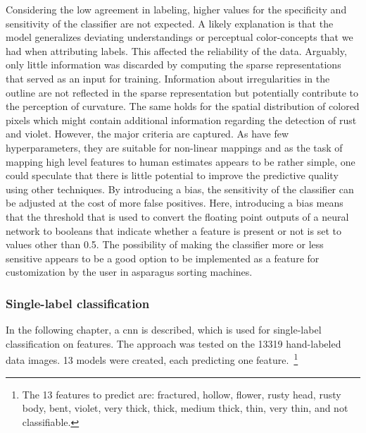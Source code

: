 Considering the low agreement in labeling, higher values for the specificity and sensitivity of the classifier are not expected. A likely explanation is that the model generalizes deviating understandings or perceptual color-concepts that we had when attributing labels. This affected the reliability of the data. Arguably, only little information was discarded by computing the sparse representations that served as an input for training. Information about irregularities in the outline are not reflected in the sparse representation but potentially contribute to the perception of curvature. The same holds for the spatial distribution of colored pixels which might contain additional information regarding the detection of rust and violet. However, the major criteria are captured. As  have few hyperparameters, they are suitable for non-linear mappings and as the task of mapping high level features to human estimates appears to be rather simple, one could speculate that there is little potential to improve the predictive quality using other techniques. By introducing a bias, the sensitivity of the classifier can be adjusted at the cost of more false positives. Here, introducing a bias means that the threshold that is used to convert the floating point outputs of a neural network to booleans that indicate whether a feature is present or not is set to values other than 0.5. The possibility of making the classifier more or less sensitive appears to be a good option to be implemented as a feature for customization by the user in asparagus sorting machines.


\subsubsection{Single-label classification}
\label{subsec:SingleLabel}

In the following chapter, a \acrlong{cnn} is described, which is used for single-label classification on features. The approach was tested on the 13319 hand-labeled data images. 13 models were created, each predicting one feature.~\footnote{The 13 features to predict are: fractured, hollow, flower, rusty head, rusty body, bent, violet, very thick, thick, medium thick, thin, very thin, and not classifiable.}

